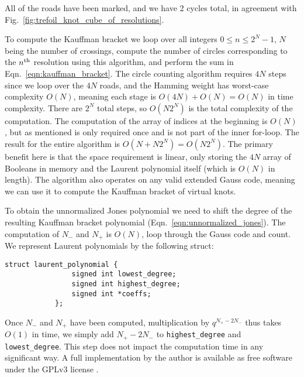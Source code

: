         All of the roads have been marked, and we have 2 cycles total,
        in agreement with Fig.~\ref{fig:trefoil_knot_cube_of_resolutions}.
        \par\hfill\par
        To compute the Kauffman bracket we loop over all integers
        $0\leq{n}\leq{2}^{N}-1$, $N$ being the number of crossings, compute the
        number of circles corresponding to the $n^{\small\textrm{th}}$
        resolution using this
        algorithm, and perform the sum in Eqn.~\ref{eqn:kauffman_bracket}. The
        circle counting algorithm requires $4N$ steps since we loop over the
        $4N$ roads, and the Hamming weight has worst-case complexity $O(N)$,
        meaning each stage is $O(4N)+O(N)=O(N)$ in time complexity. There are
        $2^{N}$ total steps, so $O(N2^{N})$ is the total complexity of the
        computation. The computation of the array of indices at the beginning
        is $O(N)$, but as mentioned is only required once and is not part of
        the inner for-loop. The result for the entire algorithm is
        $O(N+N2^{N})=O(N2^{N})$. The primary benefit here is that the space
        requirement is linear, only storing the $4N$ array of Booleans in
        memory and the Laurent polynomial itself (which is $O(N)$ in length).
        The algorithm also operates on any valid extended Gauss code, meaning
        we can use it to compute the Kauffman bracket of virtual knots.
        \par\hfill\par
        To obtain the unnormalized Jones polynomial we need to shift
        the degree of the resulting Kauffman bracket polynomial
        (Eqn.~\ref{eqn:unnormalized_jones}). The computation of $N_{-}$ and
        $N_{+}$ is $O(N)$, loop through the Gauss code and count.
        We represent Laurent polynomials by the following struct:
        \begin{lstlisting}[style=CStyle, gobble=12]
            struct laurent_polynomial {
                signed int lowest_degree;
                signed int highest_degree;
                signed int *coeffs;
            };
        \end{lstlisting}
        Once $N_{-}$ and $N_{+}$ have been computed,
        multiplication by $q^{N_{+}-2N_{-}}$ thus takes $O(1)$ in time, we
        simply add $N_{+}-2N_{-}$ to \texttt{highest\_degree} and
        \texttt{lowest\_degree}. This step does not impact the computation time
        in any significant way. A full implementation by the author is
        available as free software under the GPLv3 license
        \cite{MaguireJones}.
